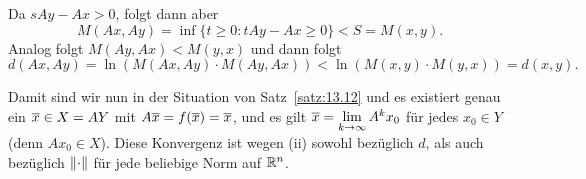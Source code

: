 \begin{beweis}
\begin{enumerate}[(i)]
		Da $sAy-Ax > 0$, folgt dann aber
		\[
			M(Ax,Ay) = \inf\{t \geq 0 : tAy-Ax \geq 0\} < S = M(x,y).
		\]
		Analog folgt $M(Ay,Ax) < M(y,x)$ und dann folgt
		\[
			d(Ax,Ay) = \ln(M(Ax,Ay) \cdot M(Ay,Ax)) < \ln(M(x,y) \cdot M(y,x)) = d(x,y).
		\]
	
		Damit sind wir nun in der Situation von Satz~\ref{satz:13.12} und es existiert genau ein $\overline{x} \in X = AY$ mit $A\overline{x} = f(\overline{x}) = \overline{x}$, und es gilt $\overline{x} = \lim\limits_{k\rightarrow \infty} A^k x_0$ für jedes $x_0 \in Y$ (denn $Ax_0 \in X$).
		Diese Konvergenz ist wegen (ii) sowohl bezüglich $d$, als auch bezüglich $\left\lVert\cdot\right\rVert$ für jede beliebige Norm auf $\mathbb{R}^n$. 
	\end{enumerate}
\end{beweis}
\cleardoubleoddemptypage